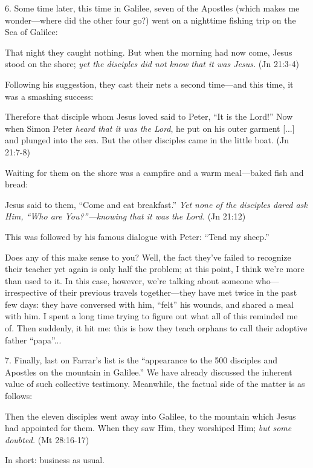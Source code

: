 6. Some time later, this time in Galilee, seven of the Apostles (which makes me wonder---where did the other four go?) went on a nighttime fishing trip on the Sea of Galilee:

\begin{smallquote}
    That night they caught nothing. But when the morning had now come, Jesus stood on the shore; \emph{yet the disciples did not know that it was Jesus.} (Jn 21:3-4)
\end{smallquote}
Following his suggestion, they cast their nets a second time---and this time, it was a smashing success:

\begin{smallquote}
    Therefore that disciple whom Jesus loved said to Peter, ``It is the Lord!'' Now when Simon Peter \emph{heard that it was the Lord}, he put on his outer garment [...] and plunged into the sea. But the other disciples came in the little boat. (Jn 21:7-8)
\end{smallquote}
Waiting for them on the shore was a campfire and a warm meal---baked fish and bread:

\begin{smallquote}
    Jesus said to them, ``Come and eat breakfast.'' \emph{Yet none of the disciples dared ask Him, ``Who are You?''---knowing that it was the Lord.} (Jn 21:12)
\end{smallquote}
This was followed by his famous dialogue with Peter: ``Tend my sheep.''

Does any of this make sense to you? Well, the fact they've failed to recognize their teacher yet again is only half the problem; at this point, I think we're more than used to it. In this case, however, we're talking about someone who---irrespective of their previous travels together---they have met twice in the past few days: they have conversed with him, ``felt'' his wounds, and shared a meal with him. I spent a long time trying to figure out what all of this reminded me of. Then suddenly, it hit me: this is how they teach orphans to call their adoptive father ``papa''...

7. Finally, last on Farrar's list is the ``appearance to the 500 disciples and Apostles on the mountain in Galilee.'' We have already discussed the inherent value of such collective testimony. Meanwhile, the factual side of the matter is as follows:

\begin{smallquote}
    Then the eleven disciples went away into Galilee, to the mountain which Jesus had appointed for them. When they saw Him, they worshiped Him; \emph{but some doubted.} (Mt 28:16-17)
\end{smallquote}
In short: business as usual.

